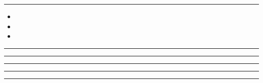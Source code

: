 \documentclass[11pt,a4paper]{article}
\begin{document}
\swarmwrapnext\lipsum[1]\lipsum[2]\lipsum[3]\lipsum[4]\lipsum[5]\lipsum[6]
\begin{swarmwrap}%
  \begin{minipage}[t]{2cm}
    \centering
    \textcolor{green!30}{\rule{\linewidth}{8cm}}
  \end{minipage}%
\end{swarmwrap}%
\swarmwrapnext
\begin{itemize}
  \item \lipsum[1][1-3]
  \item \lipsum[2][1-3]
  \item \lipsum[3][1-3]
\end{itemize}
\begin{swarmwrap}%
  \begin{minipage}[t]{3cm}
    \centering
    \textcolor{red!20}{\rule{\linewidth}{9cm}}
  \end{minipage}%
\end{swarmwrap}%
\swarmwrapnext\lipsum[1]\lipsum[2]
\begin{swarmwrap}%
  \begin{minipage}[t]{4cm}
    \centering
    \textcolor{red!20}{\rule{\linewidth}{10cm}}
  \end{minipage}%
\end{swarmwrap}%
\swarmwrapnext\lipsum[1]\lipsum[2]\lipsum[3]
\begin{swarmwrap}%
  \begin{minipage}[t]{5cm}
    \centering
    \textcolor{red!20}{\rule{\linewidth}{2cm}}
  \end{minipage}%
\end{swarmwrap}%
\swarmwrapnext\lipsum[1]\lipsum[2]\lipsum[3]\lipsum[4]
\begin{swarmwrap}%
  \begin{minipage}[t]{2cm}
    \centering
    \textcolor{red!20}{\rule{\linewidth}{3cm}}
  \end{minipage}%
\end{swarmwrap}%
\swarmwrapnext\lipsum[1]\lipsum[2]\lipsum[3]\lipsum[4]\lipsum[5]
\begin{swarmwrap}%
  \begin{minipage}[t]{3cm}
    \centering
    \textcolor{red!20}{\rule{\linewidth}{4cm}}
  \end{minipage}%
\end{swarmwrap}%
\end{document}
